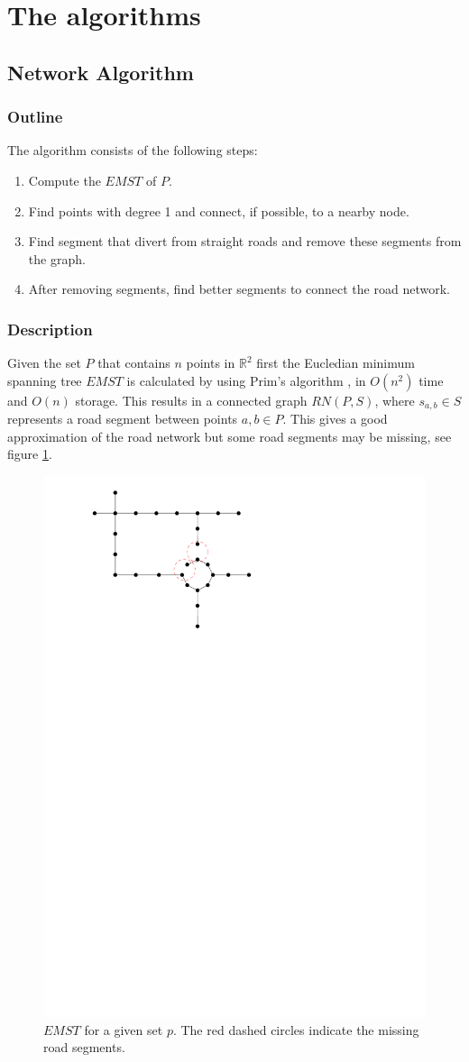 \documentclass[11pt]{article}
\begin{document}
\section{The algorithms}
\label{se:algorithms}
\subsection{Network Algorithm}
\subsubsection{Outline}
The algorithm consists of the following steps:
\begin{enumerate}
  \item Compute the $EMST$ of $P$.
  \item Find points with degree 1 and connect, if possible, to a nearby node.
  \item Find segment that divert from straight roads and remove these segments from the graph.
  \item After removing segments, find better segments to connect the road network.
\end{enumerate}
  
\subsubsection{Description}
Given the set $P$ that contains $n$ points in $\mathbb{R}^2$ first the Eucledian minimum spanning tree $EMST$ is calculated by using Prim's algorithm \cite{p-scnsg-57}, in $O(n^2)$ time and $O(n)$ storage. This results in a connected graph $RN(P,S)$, where $s_{a,b}\in S$ represents a road segment between points $a,b \in P$. This gives a good approximation of the road network but some road segments may be missing, see figure \ref{emst}.

\begin{figure}[h]
  \centering
      \graphicspath{ {images/}}
      \includegraphics[width=0.5\linewidth]{NetworkMST}
      \caption{$EMST$ for a given set $p$. The red dashed circles indicate the missing road segments.}
      \label{emst}
  \end{figure}
\end{document}
